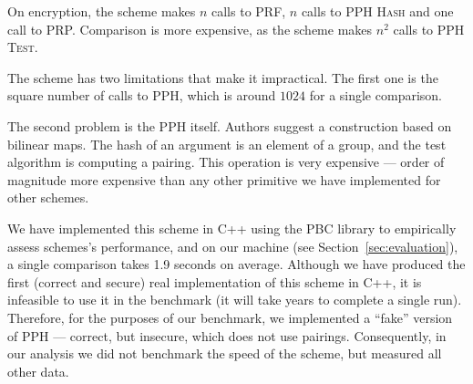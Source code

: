 		On encryption, the scheme makes $n$ calls to PRF, $n$ calls to PPH \textsc{Hash} and one call to PRP\@.
		Comparison is more expensive, as the scheme makes $n^2$ calls to PPH \textsc{Test}.

		The scheme has two limitations that make it impractical.
		The first one is the square number of calls to PPH, which is around $1024$ for a single comparison.

		The second problem is the PPH itself.
		Authors suggest a construction based on bilinear maps.
		The hash of an argument is an element of a group, and the test algorithm is computing a pairing.
		This operation is very expensive --- order of magnitude more expensive than any other primitive we have implemented for other schemes.

		We have implemented this scheme in C++ using the PBC library \cite{pbc} to empirically assess schemes's performance, and on our machine (see Section~\ref{sec:evaluation}), a single comparison takes 1.9 seconds on average.
		Although we have produced the first (correct and secure) real implementation of this scheme in C++, it is infeasible to use it in the benchmark (it will take years to complete a single run).
		Therefore, for the purposes of our benchmark, we implemented a ``fake'' version of PPH --- correct, but insecure, which does not use pairings.
		Consequently, in our analysis we did not benchmark the speed of the scheme, but measured all other data.
